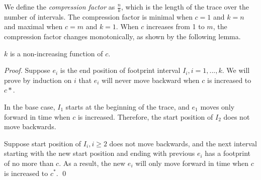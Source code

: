 We define the \emph{compression factor} as $\frac{n}{k}$, which is the
length of the trace over the number of intervals.  The compression
factor is minimal when $c=1$ and $k=n$ and maximal when $c=m$ and
$k=1$.  When $c$ increases from 1 to $m$, the compression factor
changes monotonically, as shown by the following lemma.

\begin{lemma} $k$ is a non-increasing function of $c$.
\end{lemma}

\begin{proof}
Suppose $e_i$ is the end position of footprint interval $I_i,
i=1,...,k$. We will prove by induction on $i$ that $e_i$ will never
move backward when $c$ is increased to $c*$.

In the base case, $I_1$ starts at the beginning of the trace, and
$e_1$ moves only forward in time when $c$ is increased.  Therefore,
the start position of $I_2$ does not move backwards.

Suppose start position of $I_i, i\geq 2$ does not move backwards,
and the next interval starting with the new start position and ending
with previous $e_i$ has a footprint of no more than $c$. As a
result, the new $e_i$ will only move forward in time when $c$ is
increased to $c^*$. \qed
\end{proof}

